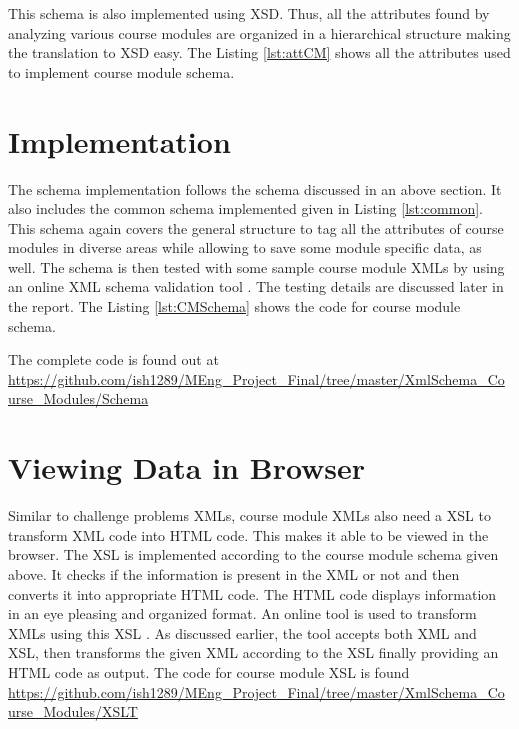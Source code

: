 \documentclass[11pt,letterpaper]{report}
\begin{document}
This schema is also implemented using XSD. Thus, all the attributes found by analyzing various course modules are organized in a hierarchical structure making the translation to XSD easy. The Listing \ref{lst:attCM} shows all the attributes used to implement course module schema.

 

\section{Implementation}
The schema implementation follows the schema discussed in an above section. It also includes the common schema implemented given in Listing \ref{lst:common}. This schema again covers the general structure to tag all the attributes of course modules in diverse areas while allowing to save some module specific data, as well. The schema is then tested with some sample course module XMLs by using an online XML schema validation tool \cite{olXSD}. The testing details are discussed later in the report.  The Listing \ref{lst:CMSchema} shows the code for course module schema. 

The complete code is found out at \url{https://github.com/ish1289/MEng_Project_Final/tree/master/XmlSchema_Course_Modules/Schema}

 

\section{Viewing Data in Browser}
Similar to challenge problems XMLs, course module XMLs also need a XSL to transform XML code into HTML code. This makes it able to be viewed in the browser. The XSL is implemented according to the course module schema given above. It checks if the information is present in the XML or not and then converts it into appropriate HTML code. The HTML code displays information in an eye pleasing and organized format. An online tool is used to transform XMLs using this XSL \cite{olXSL}. As discussed earlier, the tool accepts both XML and XSL, then transforms the given XML according to the XSL finally providing an HTML code as output. The code for course module XSL is found \url{https://github.com/ish1289/MEng_Project_Final/tree/master/XmlSchema_Course_Modules/XSLT}
\end{document}
